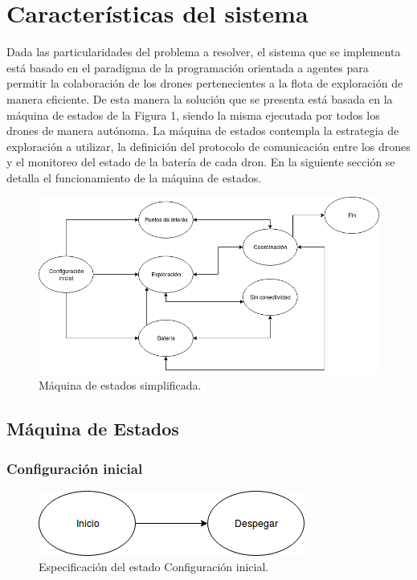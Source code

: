 \chapter{Características del sistema}

Dada las particularidades del problema a resolver, el sistema que se implementa está basado en el paradigma de la programación orientada a agentes para permitir la colaboración de los drones pertenecientes a la flota de exploración de manera eficiente. De esta manera la solución que se presenta está basada en la máquina de estados de la Figura 1, siendo la misma ejecutada por todos los drones de manera autónoma. 
La máquina de estados contempla la estrategia de exploración a utilizar, la definición del protocolo de comunicación entre los drones y el monitoreo del estado de la batería de cada dron.
En la siguiente sección se detalla el funcionamiento de la máquina de estados.

\begin{figure}[h!]
	\label{fig:comp}
	\includegraphics[width=.8\textwidth]{imagenes/chap5/image1}
	\caption{Máquina de estados simplificada.}
\end{figure}

\section{Máquina de Estados}
\subsection{Configuración inicial}

\begin{figure}[h!]
	\label{fig:comp}
	\includegraphics[width=.8\textwidth]{imagenes/chap5/image2}
	\caption{Especificación del estado Configuración inicial.}
\end{figure}

